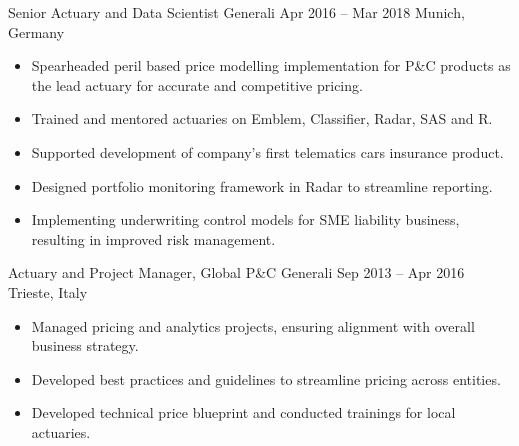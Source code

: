 \documentclass[a4paper,]{fortysecondscv}
\begin{document}
\begin{cvtable}
{\begin{itemize}[nosep, leftmargin=12pt , label={-}]
        \end{itemize}
    }
    \vspace{\topsep}
    \cvitemoneblock
    {Senior Actuary and Data Scientist}
    {Generali}
    {Apr 2016 -- Mar 2018}
    {Munich, Germany}
    {
        \begin{itemize}[nosep, leftmargin=12pt , label={-}] %
            \item Spearheaded peril based price modelling implementation for P\&C products as the lead actuary for accurate and competitive pricing.
            \item Trained and mentored actuaries on Emblem, Classifier, Radar, SAS and R.
            \item Supported development of company's first telematics cars insurance product.
            \item Designed portfolio monitoring framework in Radar to streamline reporting.
            \item Implementing underwriting control models for SME liability business, resulting in improved risk management.
        \end{itemize}
    }
    \vspace{\topsep}
    \cvitemoneblock
    {Actuary and Project Manager, Global P\&C}
    {Generali}
    {Sep 2013 -- Apr 2016}
    {Trieste, Italy}
    {
        \begin{itemize}[nosep, leftmargin=12pt , label={-}] %
            \item Managed pricing and analytics projects, ensuring alignment with overall business strategy.
            \item Developed best practices and guidelines to streamline pricing across entities.
            \item Developed technical price blueprint and conducted trainings for local actuaries.
        \end{itemize}
    }

\end{cvtable}
\end{document}
